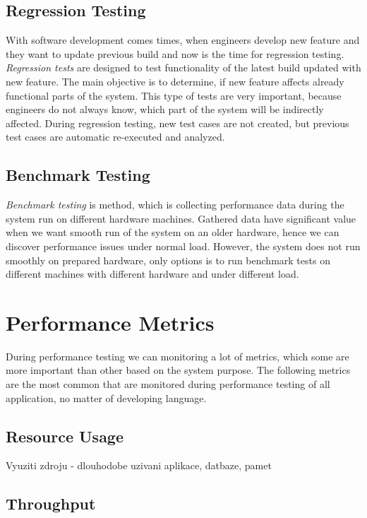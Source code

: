 \subsection*{Regression Testing}
With software development comes times, when engineers develop new feature and they want to update previous build and now is the time for regression testing. \emph{Regression tests} \cite{STF:REGRESSION} are designed to test functionality of the latest build updated with new feature. The main objective is to determine, if new feature affects already functional parts of the system. This type of tests are very important, because engineers do not always know, which part of the system will be indirectly affected. During regression testing, new test cases are not created, but previous test cases are automatic re-executed and analyzed. 


\subsection*{Benchmark Testing}
\emph{Benchmark testing} \cite{Aho:Benchmarking} is method, which is collecting performance data during the system run on different hardware machines. Gathered data have significant value when we want smooth run of the system on an older hardware, hence we can discover performance issues under normal load. However, the system does not run smoothly on prepared hardware, only options is to run benchmark tests on different machines with different hardware and under different load.  

\section{Performance Metrics}
\label{Performance Metrics}

During performance testing we can monitoring a lot of metrics, which some are more important than other based on the system purpose. The following metrics are the most common that are monitored during performance testing of all application, no matter of developing language. 


\subsection{Resource Usage}
Vyuziti zdroju - dlouhodobe uzivani aplikace, datbaze, pamet

\subsection{Throughput}

